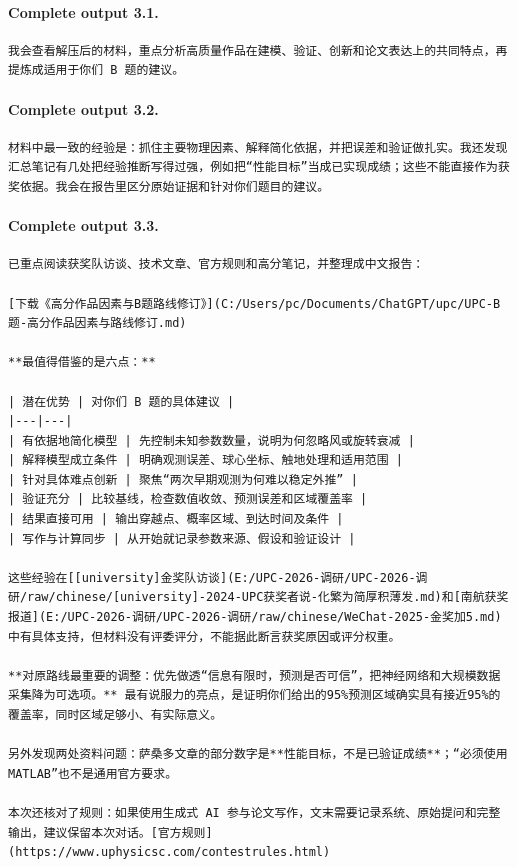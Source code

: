 \documentclass[UTF8,10pt]{ctexart}
\begin{document}
\paragraph{Complete output 3.1.}
\begin{Verbatim}[breaklines=true,breakanywhere=true,fontsize=\scriptsize,frame=single,framesep=2pt]
我会查看解压后的材料，重点分析高质量作品在建模、验证、创新和论文表达上的共同特点，再提炼成适用于你们 B 题的建议。
\end{Verbatim}

\paragraph{Complete output 3.2.}
\begin{Verbatim}[breaklines=true,breakanywhere=true,fontsize=\scriptsize,frame=single,framesep=2pt]
材料中最一致的经验是：抓住主要物理因素、解释简化依据，并把误差和验证做扎实。我还发现汇总笔记有几处把经验推断写得过强，例如把“性能目标”当成已实现成绩；这些不能直接作为获奖依据。我会在报告里区分原始证据和针对你们题目的建议。
\end{Verbatim}

\paragraph{Complete output 3.3.}
\begin{Verbatim}[breaklines=true,breakanywhere=true,fontsize=\scriptsize,frame=single,framesep=2pt]
已重点阅读获奖队访谈、技术文章、官方规则和高分笔记，并整理成中文报告：

[下载《高分作品因素与B题路线修订》](C:/Users/pc/Documents/ChatGPT/upc/UPC-B题-高分作品因素与路线修订.md)

**最值得借鉴的是六点：**

| 潜在优势 | 对你们 B 题的具体建议 |
|---|---|
| 有依据地简化模型 | 先控制未知参数数量，说明为何忽略风或旋转衰减 |
| 解释模型成立条件 | 明确观测误差、球心坐标、触地处理和适用范围 |
| 针对具体难点创新 | 聚焦“两次早期观测为何难以稳定外推” |
| 验证充分 | 比较基线，检查数值收敛、预测误差和区域覆盖率 |
| 结果直接可用 | 输出穿越点、概率区域、到达时间及条件 |
| 写作与计算同步 | 从开始就记录参数来源、假设和验证设计 |

这些经验在[[university]金奖队访谈](E:/UPC-2026-调研/UPC-2026-调研/raw/chinese/[university]-2024-UPC获奖者说-化繁为简厚积薄发.md)和[南航获奖报道](E:/UPC-2026-调研/UPC-2026-调研/raw/chinese/WeChat-2025-金奖加5.md)中有具体支持，但材料没有评委评分，不能据此断言获奖原因或评分权重。

**对原路线最重要的调整：优先做透“信息有限时，预测是否可信”，把神经网络和大规模数据采集降为可选项。** 最有说服力的亮点，是证明你们给出的95%预测区域确实具有接近95%的覆盖率，同时区域足够小、有实际意义。

另外发现两处资料问题：萨桑多文章的部分数字是**性能目标，不是已验证成绩**；“必须使用 MATLAB”也不是通用官方要求。

本次还核对了规则：如果使用生成式 AI 参与论文写作，文末需要记录系统、原始提问和完整输出，建议保留本次对话。[官方规则](https://www.uphysicsc.com/contestrules.html)
\end{Verbatim}
\end{document}

